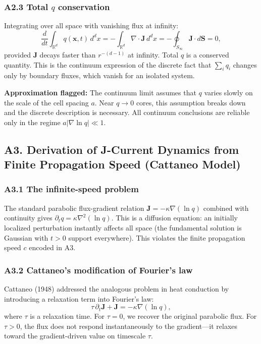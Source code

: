 \documentclass[reprint]{revtex4-2}
\begin{document}
\subsubsection{A2.3 Total $q$ conservation}

Integrating over all space with vanishing flux at infinity:
\begin{equation}
\frac{d}{dt}\int_{\mathbb{R}^d} q(\mathbf{x},t)\,d^d x = -\int_{\mathbb{R}^d} \nabla\cdot\mathbf{J}\,d^d x = -\oint_{S_\infty} \mathbf{J}\cdot d\mathbf{S} = 0,
\end{equation}
provided $\mathbf{J}$ decays faster than $r^{-(d-1)}$ at infinity. Total $q$ is a conserved quantity. This is the continuum expression of the discrete fact that $\sum_i q_i$ changes only by boundary fluxes, which vanish for an isolated system.

\textbf{Approximation flagged:} The continuum limit assumes that $q$ varies slowly on the scale of the cell spacing $a$. Near $q\to 0$ cores, this assumption breaks down and the discrete description is necessary. All continuum conclusions are reliable only in the regime $a|\nabla\ln q|\ll 1$.

\subsection{A3. Derivation of J-Current Dynamics from Finite Propagation Speed (Cattaneo Model)}

\subsubsection{A3.1 The infinite-speed problem}

The standard parabolic flux-gradient relation $\mathbf{J} = -\kappa\nabla(\ln q)$ combined with continuity gives $\partial_t q = \kappa\nabla^2(\ln q)$. This is a diffusion equation: an initially localized perturbation instantly affects all space (the fundamental solution is Gaussian with $t>0$ support everywhere). This violates the finite propagation speed $c$ encoded in A3.

\subsubsection{A3.2 Cattaneo's modification of Fourier's law}

Cattaneo (1948) addressed the analogous problem in heat conduction by introducing a relaxation term into Fourier's law:
\begin{equation}
\tau\,\partial_t \mathbf{J} + \mathbf{J} = -\kappa\nabla(\ln q),
\label{eq:cattaneo}
\end{equation}
where $\tau$ is a relaxation time. For $\tau=0$, we recover the original parabolic flux. For $\tau>0$, the flux does not respond instantaneously to the gradient---it relaxes toward the gradient-driven value on timescale $\tau$.
\end{document}
